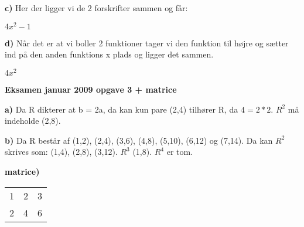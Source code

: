 \documentclass{article}
\begin{document}
\textbf{c)}
Her der ligger vi de 2 forskrifter sammen og får:

$4x^2-1$

\vspace{5mm} %

\textbf{d)}
Når det er at vi boller 2 funktioner tager vi den funktion til højre og sætter ind på den anden funktions x plads og ligger det sammen.

$4x^2$

\vspace{5mm} %

\textbf{Eksamen januar 2009 opgave 3 + matrice}

\textbf{a)}
Da R dikterer at b = 2a,  da kan kun pare (2,4) tilhører R, da $4 = 2*2$. $R^2$ må indeholde (2,8).

\vspace{5mm} %

\textbf{b)}
Da R består af (1,2), (2,4), (3,6), (4,8), (5,10), (6,12) og (7,14). Da kan $R^2$ skrives som: (1,4), (2,8), (3,12). $R^3$ (1,8). $R^4$ er tom.

\vspace{5mm} %

\textbf{matrice)}
\begin{tabular}{ | c | c | c | }
 \hline
 1 & 2 & 3 \\
 2 & 4 & 6 \\
 \hline
\end{tabular}
\end{document}
